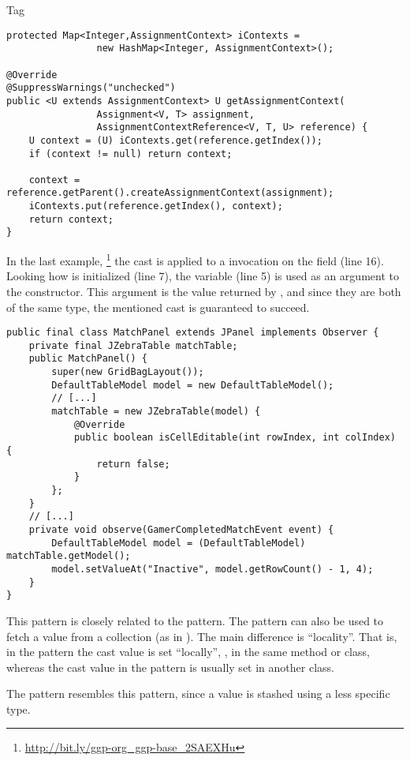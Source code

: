 \begin{pattern}{Tag}
\begin{verbatim}
protected Map<Integer,AssignmentContext> iContexts =
                new HashMap<Integer, AssignmentContext>();

@Override
@SuppressWarnings("unchecked")
public <U extends AssignmentContext> U getAssignmentContext(
                Assignment<V, T> assignment,
                AssignmentContextReference<V, T, U> reference) {
    U context = (U) iContexts.get(reference.getIndex());
    if (context != null) return context;
    
    context = reference.getParent().createAssignmentContext(assignment);
    iContexts.put(reference.getIndex(), context);
    return context;
}
\end{verbatim}

In the last example,%
\footnote{\url{http://bit.ly/ggp-org_ggp-base_2SAEXHu}}
the cast is applied to a  invocation on the  field (line 16).
Looking how  is initialized (line 7),
the  variable (line 5) is used as an argument to the constructor.
This argument is the value returned by ,
and since they are both of the same type,
the mentioned cast is guaranteed to succeed.

\begin{verbatim}
public final class MatchPanel extends JPanel implements Observer {
    private final JZebraTable matchTable;
    public MatchPanel() {
        super(new GridBagLayout());
        DefaultTableModel model = new DefaultTableModel();
        // [...]
        matchTable = new JZebraTable(model) {
            @Override
            public boolean isCellEditable(int rowIndex, int colIndex) {
                return false;
            }
        };
    }
    // [...]
    private void observe(GamerCompletedMatchEvent event) {
        DefaultTableModel model = (DefaultTableModel) matchTable.getModel();
        model.setValueAt("Inactive", model.getRowCount() - 1, 4);
    }
}
\end{verbatim}


\detection{}

\discussion{}

\related{}
This pattern is closely related to the  pattern.
The \thisp{} pattern can also be used to fetch a value from a collection (as in ).
The main difference is ``locality''.
That is, in the \thisp{} pattern the cast value is set ``locally'', \ie,
in the same method or class,
whereas the cast value in the  pattern is usually set in another class.

The  pattern resembles this pattern,
since a value is stashed using a less specific type.

\end{pattern}